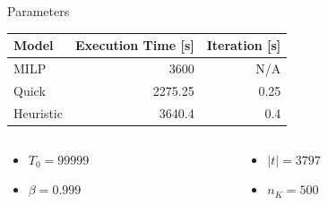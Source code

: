\documentclass[aspectratio=169,dvipsnames]{beamer}
\begin{document}
\begin{frame}[label={sec:org5844a00}]{Parameters}
\begin{center}
\begin{tabular}{lrr}
\alert{Model} & \alert{Execution Time} [s] & \alert{Iteration} [s]\\[0pt]
\hline
MILP & 3600 & N/A\\[0pt]
Quick & 2275.25 & 0.25\\[0pt]
Heuristic & 3640.4 & 0.4\\[0pt]
\end{tabular}
\end{center}

\begin{columns}
\begin{column}{0.5\columnwidth}
\begin{itemize}
\item \(T_0 = 99999\)
\item \(\beta = 0.999\)
\end{itemize}
\end{column}
\begin{column}{0.5\columnwidth}
\begin{itemize}
\item \(|t| = 3797\)
\item \(n_K = 500\)
\end{itemize}
\end{column}
\end{columns}
\end{frame}
\end{document}
